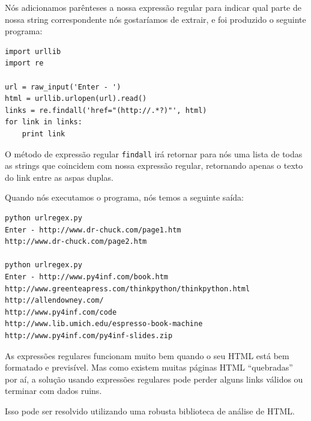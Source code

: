 Nós adicionamos parênteses a nossa expressão regular para indicar qual parte
de nossa string correspondente nós gostaríamos de extrair, e foi produzido o
seguinte programa:

\beforeverb
\begin{verbatim}
import urllib
import re

url = raw_input('Enter - ')
html = urllib.urlopen(url).read()
links = re.findall('href="(http://.*?)"', html)
for link in links:
    print link
\end{verbatim}
\afterverb

O método de expressão regular {\tt findall} irá retornar para nós uma lista
de todas as strings que coincidem com nossa expressão regular, retornando
apenas o texto do link entre as aspas duplas.

Quando nós executamos o programa, nós temos a seguinte saída:

\beforeverb
\begin{verbatim}
python urlregex.py 
Enter - http://www.dr-chuck.com/page1.htm
http://www.dr-chuck.com/page2.htm

python urlregex.py 
Enter - http://www.py4inf.com/book.htm
http://www.greenteapress.com/thinkpython/thinkpython.html
http://allendowney.com/
http://www.py4inf.com/code
http://www.lib.umich.edu/espresso-book-machine
http://www.py4inf.com/py4inf-slides.zip
\end{verbatim}
\afterverb

As expressões regulares funcionam muito bem quando o seu HTML está bem
formatado e previsível.  Mas como existem muitas páginas HTML ``quebradas''
por aí, a solução usando expressões regulares pode perder alguns links
válidos ou terminar com dados ruins.

Isso pode ser resolvido utilizando uma robusta biblioteca de análise de HTML.

